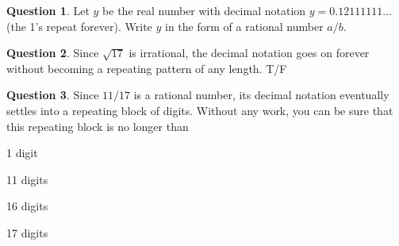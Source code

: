 \documentclass[12pt]{amsart}
\theoremstyle{definition}
\newtheorem{question}{Question}
\begin{document}
\begin{question}
Let $y$ be the real number with decimal notation $y = 0.12111111\ldots$ (the 1's repeat forever). Write $y$ in the form of a rational number $a/b$.
\end{question}

\begin{question}
Since $\sqrt{17}$ is irrational, the decimal notation goes on forever without becoming a repeating pattern of any length. T/F
\end{question}

\begin{question}
Since $11/17$ is a rational number, its decimal notation eventually settles into a repeating block of digits. Without any work, you can be sure that this repeating block is no longer than
\begin{compactitem}
\item 1 digit
\item 11 digits
\item 16 digits
\item 17 digits
\end{compactitem}
\end{question}
\end{document}
